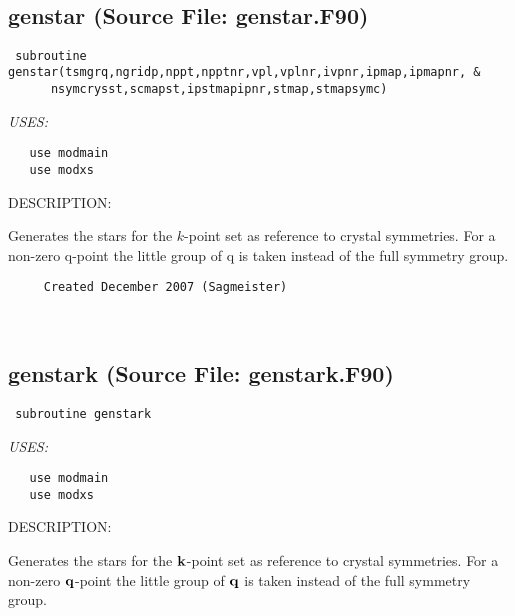 \documentclass[11pt]{article}
\begin{document}

 
 
\mbox{}\hrulefill\ 
 
\subsection{genstar (Source File: genstar.F90)}


\begin{verbatim} subroutine genstar(tsmgrq,ngridp,nppt,npptnr,vpl,vplnr,ivpnr,ipmap,ipmapnr, &
      nsymcrysst,scmapst,ipstmapipnr,stmap,stmapsymc)\end{verbatim}{\em USES:}
\begin{verbatim}   use modmain
   use modxs\end{verbatim}
{\sf DESCRIPTION:\\ }


     Generates the stars for the $k$-point set as reference to crystal
     symmetries. For a non-zero q-point the little group of q is taken
     instead of the full symmetry group.
  
\begin{verbatim}     Created December 2007 (Sagmeister)\end{verbatim}


 
 
\mbox{}\hrulefill\ 
 
\subsection{genstark (Source File: genstark.F90)}


\begin{verbatim} subroutine genstark\end{verbatim}{\em USES:}
\begin{verbatim}   use modmain
   use modxs\end{verbatim}
{\sf DESCRIPTION:\\ }


     Generates the stars for the ${\bf k}$-point set as reference to crystal
     symmetries. For a non-zero ${\bf q}$-point the little group of ${\bf q}$
     is taken instead of the full symmetry group.
  
\end{document}
